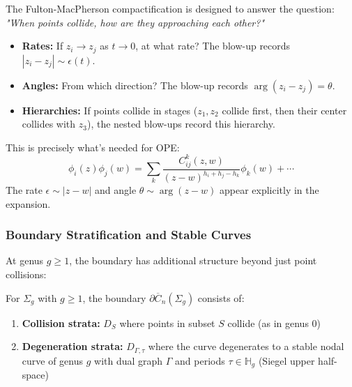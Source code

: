 \begin{remark}\label{rem:recording-collisions}
The Fulton-MacPherson compactification is designed to answer the question: \emph{"When points collide, how are they approaching each other?"}

\begin{itemize}
\item \textbf{Rates:} If $z_i \to z_j$ as $t \to 0$, at what rate? The blow-up records $|z_i - z_j| \sim \epsilon(t)$.
\item \textbf{Angles:} From which direction? The blow-up records $\arg(z_i - z_j) = \theta$.
\item \textbf{Hierarchies:} If points collide in stages ($z_1, z_2$ collide first, then their center collides with $z_3$), the nested blow-ups record this hierarchy.
\end{itemize}

This is precisely what's needed for OPE:
$$\phi_i(z)\phi_j(w) = \sum_k \frac{C_{ij}^k(z,w)}{(z-w)^{h_i+h_j-h_k}} \phi_k(w) + \cdots$$
The rate $\epsilon \sim |z-w|$ and angle $\theta \sim \arg(z-w)$ appear explicitly in the expansion.
\end{remark}

\subsubsection{Boundary Stratification and Stable Curves}

At genus $g \geq 1$, the boundary has additional structure beyond just point collisions:

\begin{theorem}\label{thm:boundary-higher-genus}
For $\Sigma_g$ with $g \geq 1$, the boundary $\partial\overline{C}_n(\Sigma_g)$ consists of:

\begin{enumerate}
\item \textbf{Collision strata:} $D_S$ where points in subset $S$ collide (as in genus 0)
\item \textbf{Degeneration strata:} $D_{\Gamma,\tau}$ where the curve degenerates to a stable nodal curve of genus $g$ with dual graph $\Gamma$ and periods $\tau \in \mathbb{H}_g$ (Siegel upper half-space)
\end{enumerate}
\end{theorem}

